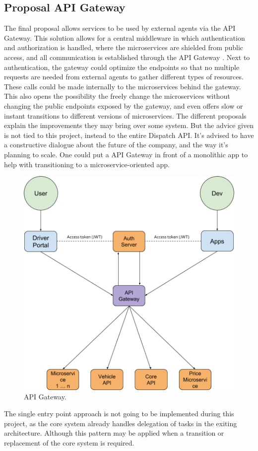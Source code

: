 \subsection{Proposal API Gateway}
The final proposal allows services to be used by external agents via the API Gateway. This solution allows for a central middleware in which authentication and authorization is handled, where the microservices are shielded from public access, and all communication is established through the API Gateway \cite{api-gateway}. Next to authentication, the gateway could optimize the endpoints so that no multiple requests are needed from external agents to gather different types of resources. These calls could be made internally to the microservices behind the gateway. This also opens the possibility the freely change the microservices without changing the public endpoints exposed by the gateway, and even offers slow or instant transitions to different versions of microservices. The different proposals explain the improvements they may bring over some system. But the advice given is not tied to this project, instead to the entire Dispatch API. It’s advised to have a constructive dialogue about the future of the company, and the way it’s planning to scale. One could put a API Gateway in front of a monolithic app to help with transitioning to a microservice-oriented app.

\begin{figure}[H]
	\centering
	\includegraphics[width=.7\textwidth]{Auth3}
	\caption[API Gateway]{API Gateway.}
	\label{fig:Auth3}
\end{figure}

The single entry point approach is not going to be implemented during this project, as the core system already handles delegation of tasks in the exiting architecture. Although this pattern may be applied when a transition or replacement of the core system is required.

